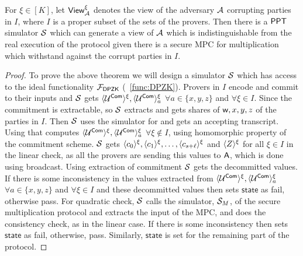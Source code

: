 \begin{lemma}\label{lem:privacy}
	For $\xi\in [K]$, let $\mathsf{View}^{\xi}_{\mathcal{A}}$ denotes the view of the adversary $\mathcal{A}$ corrupting parties in $I$, where $I$ is a proper subset of the sets of the provers. Then there is a $\mathsf{PPT}$ simulator $\mathcal{S}$ which can generate a view of $\mathcal{A}$ which is indistinguishable from the real execution of the protocol given there is a secure MPC for multiplication which withstand against the corrupt parties in $I$. 
\end{lemma}

\begin{proof}
	To prove the above theorem we will design a simulator $\mathcal{S}$ which has access to the ideal functionality $\mathcal{F}_{\mathsf{DPZK}}$ (~\ref{func:DPZK}). Provers in $I$ encode and commit to their inputs and $\mathcal{S}$ gets $\langle{\mathcal{U}^{\mathsf{Com}}}\rangle^\xi, \langle{\mathcal{U}^{\mathsf{Com}}}\rangle^\xi_a$ $\forall a\in\{x,y,z\}$ and $\forall \xi \in I$. Since the commitment is extractable, so $\mathcal{S}$ extracts and gets shares of $\mathsf{w}, x,y,z$ of the parties in $I$. 
	Then $\mathcal{S}$ uses the simulator for \name and gets an accepting transcript. Using that computes $\langle{\mathcal{U}^{\mathsf{Com}}}\rangle^\xi, \langle{\mathcal{U}^{\mathsf{Com}}}\rangle^\xi_a$ $\forall \xi\notin I$, using homomorphic property of the commitment scheme.
	$\mathcal{S}$ gets $\langle{c_0}\rangle^\xi, \langle{c_1}\rangle^\xi, \ldots, \langle{c_{s+\ell}}\rangle^\xi$ and $\langle{Z}\rangle^\xi$ for all $\xi\in I$ in the linear check, as all the provers are sending this values to $\mathsf{A}$, which is done using broadcast. Using extraction of commitment $\mathcal{S}$ gets the decommitted values. If there is some inconsistency in the values extracted from $\langle{\mathcal{U}^{\mathsf{Com}}}\rangle^\xi, \langle{\mathcal{U}^{\mathsf{Com}}}\rangle^\xi_a$ $\forall a\in\{x,y,z\}$ and $\forall \xi \in I$ and these decommitted values then
	sets $\mathsf{state}$ as fail, otherwise pass.
	For quadratic check, $\mathcal{S}$ calls the simulator, $\mathcal{S}_M$, of the secure multiplication protocol and extracts the input of the MPC, and does the consistency check, as in the linear case. If there is some inconsistency then 
	sets $\mathsf{state}$ as fail, otherwise, pass.
	Similarly, $\mathsf{state}$ is set for the remaining part of the protocol.

\end{proof}
